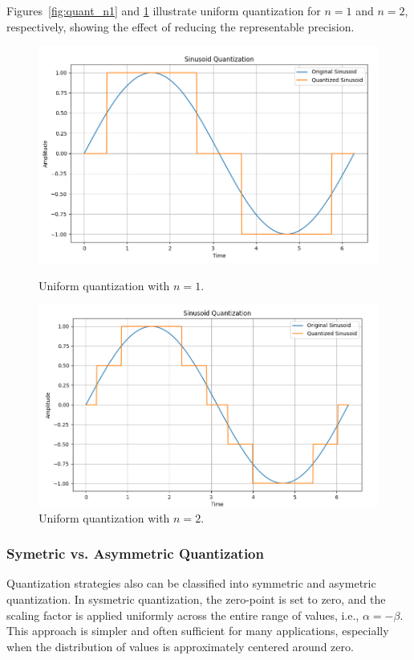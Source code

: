 Figures~\ref{fig:quant_n1} and \ref{fig:quant_n2} illustrate uniform quantization for $n=1$ and $n=2$, respectively, showing the effect of reducing the representable precision.
\begin{figure}[H]
    \centering
    \begin{minipage}{0.48\textwidth}
        \centering
        \includegraphics[width=0.75\linewidth]{figuras/2-fundamentos/quantization_n=1.png}
        \caption{Uniform quantization with $n=1$.}
        \label{fig:quant_n1}
    \end{minipage}
    \hfill
    \begin{minipage}{0.48\textwidth}
        \centering
        \includegraphics[width=0.75\linewidth]{figuras/2-fundamentos/quantization_n=2.png}
        \caption{Uniform quantization with $n=2$.}
        \label{fig:quant_n2}
    \end{minipage}
\end{figure}

\subsubsection*{Symetric vs. Asymmetric Quantization}
Quantization strategies also can be classified into symmetric and asymetric quantization. In sysmetric quantization, the zero-point is set to zero, and the scaling factor is applied uniformly across the entire range of values, i.e., $\alpha = -\beta$. This approach is simpler and often sufficient for many applications, especially when the distribution of values is approximately centered around zero.

